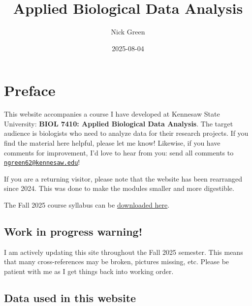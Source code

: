 \documentclass[
  13,
  letterpaper,
]{report}
\title{Applied Biological Data Analysis}
\author{Nick Green}
\date{2025-08-04}
\renewcommand*\contentsname{Table of contents}
\newcommand\contentsname{Table of contents}
\begin{document}
\maketitle

\renewcommand*\contentsname{Table of contents}
{
\hypersetup{linkcolor=}
\setcounter{tocdepth}{2}
\tableofcontents
}


\chapter*{Preface}\label{preface}


This website accompanies a course I have developed at Kennesaw State
University: \textbf{BIOL 7410: Applied Biological Data Analysis}. The
target audience is biologists who need to analyze data for their
research projects. If you find the material here helpful, please let me
know! Likewise, if you have comments for improvement, I'd love to hear
from you: send all comments to
\href{mailto:ngreen62@kennesaw.edu}{\nolinkurl{ngreen62@kennesaw.edu}}!

If you are a returning visitor, please note that the website has been
rearranged since 2024. This was done to make the modules smaller and
more digestible.

The Fall 2025 course syllabus can be
\href{https://greenquanteco.github.io/book/202503\%20biol\%207410\%20syllabus\%202025-08-05.pdf}{downloaded
here}.

\section*{Work in progress warning!}\label{work-in-progress-warning}


I am actively updating this site throughout the Fall 2025 semester. This
means that many cross-references may be broken, pictures missing, etc.
Please be patient with me as I get things back into working order.

\section*{Data used in this website}\label{data-used-in-this-website}
\end{document}

